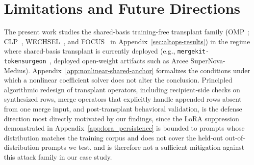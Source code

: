 \section{Limitations and Future Directions}
\label{app:limitations}

The present work studies the shared-basis training-free transplant family (OMP~\citep{goddard2025tftransplant}; CLP~\citep{ostendorff2023efficient}, WECHSEL~\citep{minixhofer2021wechsel}, and FOCUS~\citep{dobler2023focus} in Appendix~\ref{sec:altops-results}) in the regime where shared-basis transplant is currently deployed (e.g., \texttt{mergekit-tokensurgeon}~\citep{mergekit2024}, deployed open-weight artifacts such as Arcee SuperNova-Medius). Appendix~\ref{app:nonlinear-shared-anchor} formalizes the conditions under which a nonlinear coefficient solver does not alter the conclusion. Principled algorithmic redesign of transplant operators, including recipient-side checks on synthesized rows, merge operators that explicitly handle appended rows absent from one merge input, and post-transplant behavioral validation, is the defense direction most directly motivated by our findings, since the LoRA suppression demonstrated in Appendix~\ref{app:lora_persistence} is bounded to prompts whose distribution matches the training corpus and does not cover the held-out out-of-distribution prompts we test, and is therefore not a sufficient mitigation against this attack family in our case study.
